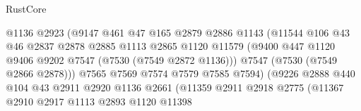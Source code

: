 \begin{lexlean}{RustCore}
\begin{coremodule}
                                      @1136
                                      @2923
                                      (@9147
                                        @461
                                        @47
                                        @165
                                        @2879
                                        @2886
                                        @1143
                                        (@11544
                                          @106
                                          @43
                                          @46
                                          @2837
                                          @2878
                                          @2885
                                          @1113
                                          @2865
                                          @1120
                                          @11579
                                          (@9400
                                            @447
                                            @1120
                                            @9406
                                            @9202
                                            @7547
                                            (@7530 (@7549 @2872 @1136)))
                                          @7547
                                          (@7530 (@7549 @2866 @2878)))
                                        @7565
                                        @7569
                                        @7574
                                        @7579
                                        @7585
                                        @7594)
                                      (@9226
                                        @2888
                                        @440
                                        @104
                                        @43
                                        @2911
                                        @2920
                                        @1136
                                        @2661
                                        (@11359
                                          @2911
                                          @2918
                                          @2775
                                          (@11367
                                            @2910
                                            @2917
                                            @1113
                                            @2893
                                            @1120
                                            @11398

\end{coremodule}
\end{lexlean}
